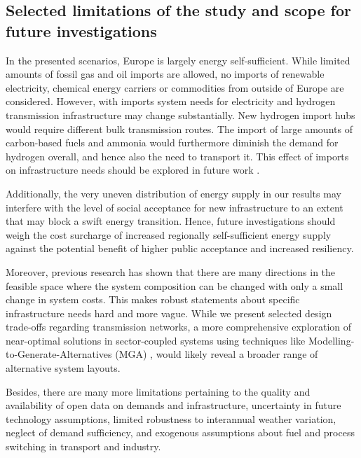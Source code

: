 \subsection*{Selected limitations of the study and scope for future investigations}

In the presented scenarios, Europe is largely energy self-sufficient. While
limited amounts of fossil gas and oil imports are allowed, no imports of
renewable electricity, chemical energy carriers or commodities from outside of
Europe are considered. However, with imports system needs for electricity and
hydrogen transmission infrastructure may change substantially. New hydrogen
import hubs would require different bulk transmission routes. The import of
large amounts of carbon-based fuels and ammonia would furthermore diminish the
demand for hydrogen overall, and hence also the need to transport it. This
effect of imports on infrastructure needs should be explored in future work
\cite{fasihiTechnoeconomicAssessment2019,heuserTechnoeconomicAnalysis2019,hamppImportOptions2021}.

Additionally, the very uneven distribution of energy supply in our results may
interfere with the level of social acceptance for new infrastructure to an
extent that may block a swift energy transition. Hence, future investigations
should weigh the cost surcharge of increased regionally self-sufficient energy
supply against the potential benefit of higher public acceptance and increased
resiliency.

Moreover, previous research has shown that there are many directions in the
feasible space where the system composition can be changed with only a small
change in system costs. This makes robust statements about specific
infrastructure needs hard and more vague. While we present selected design
trade-offs regarding transmission networks, a more comprehensive exploration of
near-optimal solutions in sector-coupled systems using techniques like
Modelling-to-Generate-Alternatives (MGA)
\cite{Neumann2019,lombardiPolicyDecision2020,pedersenModelingAll2020,pickeringDiversityOptions},
would likely reveal a broader range of alternative system layouts.


Besides, there are many more limitations pertaining to the quality and
availability of open data on demands and infrastructure, uncertainty in future
technology assumptions, limited robustness to interannual weather variation,
neglect of demand sufficiency, and exogenous assumptions about fuel and process
switching in transport and industry. %

